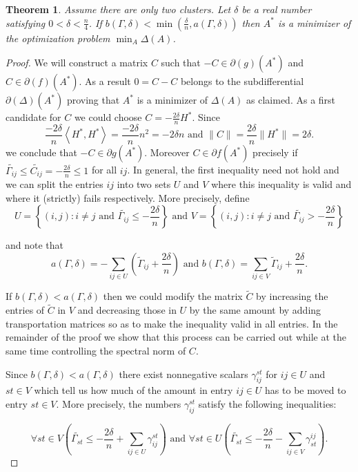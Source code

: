 \documentclass[12pt]{amsart}
\newtheorem{thm}[lemma]{Theorem}
\theoremstyle{remark}
\begin{document}
\begin{thm}\label{thm: transport}  Assume there are only two clusters. Let $\delta$ be a real number satisfying $0<\delta< \frac{n}{4}$. If $b(\Gamma,\delta)< \min(\frac{\delta}{n}, a(\Gamma,\delta))$ then $A^*$ is a minimizer of the optimization problem $\min_A\Delta(A)$.
\end{thm} 
\begin{proof} We will construct a matrix $C$ such that 
$-C \in \partial(g)(A^*)$ and $C \in \partial(f)(A^*)$. As a result $0=C-C$ belongs to the subdifferential $\partial(\Delta)(A^*)$ proving that $A^*$ is a minimizer of $\Delta(A)$ as claimed. As a first candidate for $C$ we could choose $C=-\frac{2\delta}{n}H^*$. Since \[
 \frac{-2\delta}{n}\left \langle H^*,H^* \right \rangle =  \frac{-2\delta}{n}n^2 = -2\delta n \text{ and } \|C\|= \frac{2\delta}{n}\|H^*\|= 2\delta.
\]
we conclude that $-C\in \partial g(A^*)$. Moreover $C\in \partial f(A^*)$ precisely if $\widetilde{\Gamma_{ij}} \leq \widetilde{C_{ij}}= -\frac{2\delta}{n} \leq 1$ for all $ij$. 
In general, the first inequality need not hold and we can split the entries $ij$ into two sets $U$ and $V$ where this inequality is valid and where it (strictly) fails respectively. More precisely, define 
\[U=\left\{(i,j): i\neq j \text{ and $\widetilde{\Gamma_{ij}}\leq -\frac{2\delta}{n}$}\right\}\text{ and } V=\left\{(i,j): i\neq j \text{ and $\widetilde{\Gamma_{ij}}>-\frac{2\delta}{n}$}\right\}\] 

and note that
\[
a(\Gamma,\delta) = -\sum_{ij \in U}\left( \widetilde{\Gamma}_{ij}+ \frac{2\delta}{n}\right) \text{ and } b(\Gamma,\delta) =  \sum_{ij \in V} \widetilde{\Gamma}_{ij} + \frac{2\delta}{n}.
\]


If $b(\Gamma,\delta)< a(\Gamma,\delta)$ then we could modify the matrix $\widetilde{C}$ by increasing the entries of $\widetilde{C}$ in $V$ and decreasing those in $U$ by the same amount by adding transportation matrices so as to make the inequality valid in all entries. In the remainder of the proof we show that this process can be carried out while at the same time controlling the spectral norm of $C$.

Since $b(\Gamma,\delta)<a(\Gamma,\delta)$ there exist nonnegative scalars $\gamma_{ij}^{st}$ for $ij\in U$ and $st\in V$ which tell us how much of the amount in entry $ij\in U$ has to be moved to entry $st\in V$. More precisely, the numbers $\gamma_{ij}^{st}$ satisfy the following inequalities:

\begin{equation}\label{ineqs1}
\forall st\in V\left( \widetilde{\Gamma_{st}}  \leq -\frac{2\delta}{n} +\sum_{ij\in U}\gamma_{ij}^{st}\right) \text{ and } \forall st\in U\left( \widetilde{\Gamma_{st}} \leq -\frac{2\delta}{n} -\sum_{ij\in V}\gamma_{st}^{ij}\right).
\end{equation} 


\end{proof}
\end{document}

